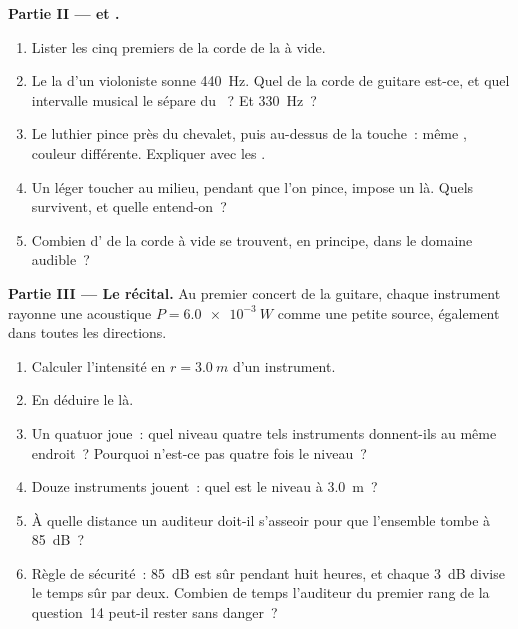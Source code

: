 \begin{problem}
\medskip
\noindent\textbf{Partie II ---  et .}
\begin{enumerate}[resume]
  \item Lister les cinq premiers  de la corde de la à
        vide.
  \item Le la d'un violoniste sonne \qty{440}{Hz}. Quel
         de la corde de guitare est-ce, et quel
        intervalle musical le sépare du ~? Et
        \qty{330}{Hz}~?
  \item Le luthier pince près du chevalet, puis au-dessus de la
        touche~: même , couleur différente. Expliquer
        avec les .
  \item Un léger toucher au milieu, pendant que l'on pince, impose
        un  là. Quels  survivent, et
        quelle  entend-on~?
  \item Combien d' de la corde à vide se trouvent,
        en principe, dans le domaine audible~?
\end{enumerate}

\medskip
\noindent\textbf{Partie III --- Le récital.}
Au premier concert de la guitare, chaque instrument rayonne une
 acoustique $P = \qty{6.0e-3}{W}$ comme une petite
source, également dans toutes les directions.
\begin{enumerate}[resume]
  \item Calculer l'intensité en $r = \qty{3.0}{m}$ d'un instrument.
  \item En déduire le  là.
  \item Un quatuor joue~: quel niveau quatre tels instruments donnent-ils
        au même endroit~? Pourquoi n'est-ce pas quatre fois le niveau~?
  \item Douze instruments jouent~: quel est le niveau à \qty{3.0}{m}~?
  \item À quelle distance un auditeur doit-il s'asseoir pour que
        l'ensemble tombe à \qty{85}{dB}~?
  \item Règle de sécurité~: \qty{85}{dB} est sûr pendant huit heures, et
        chaque \qty{+3}{dB} divise le temps sûr par deux. Combien de
        temps l'auditeur du premier rang de la question~14 peut-il
        rester sans danger~?
\end{enumerate}


\end{problem}
